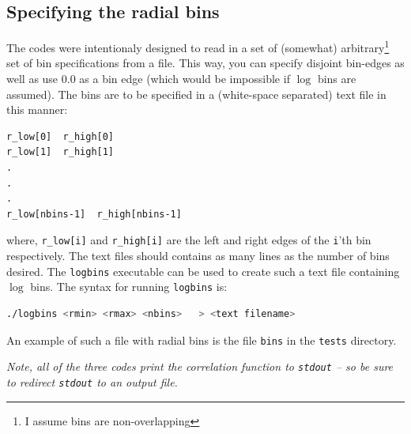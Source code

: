 \documentclass[12pt,titlepage]{article}
\begin{document}
\subsection{Specifying the radial bins}\label{section:bins}
The codes were intentionaly designed to read in a set of (somewhat) arbitrary\footnote{I assume bins are non-overlapping} set of bin specifications from a file. This way, you can specify disjoint bin-edges as well as 
use $0.0$ as a bin edge (which would be impossible if $\log$ bins are assumed). The bins are to be specified in a (white-space separated) text file in this manner:
\begin{verbatim}
r_low[0]  r_high[0]
r_low[1]  r_high[1]
.
.
.
r_low[nbins-1]  r_high[nbins-1]
\end{verbatim}
where, \texttt{r\_low[i]} and \texttt{r\_high[i]} are the left and right edges of the \texttt{i}'th bin respectively. The text files should contains as many lines as the number of 
bins desired. The \texttt{logbins} executable can be used to create such a text file containing $\log$ bins. The syntax for running \texttt{logbins} is:
\begin{lstlisting}[language=sh,numbers=none]
./logbins <rmin> <rmax> <nbins>   > <text filename>
\end{lstlisting}
An example of such a file with radial bins is the file \texttt{bins} in the \texttt{tests} directory. 

{\em Note, all of the three codes print the correlation function to \texttt{stdout} -- so be sure to redirect \texttt{stdout} to an output file. }
\end{document}
